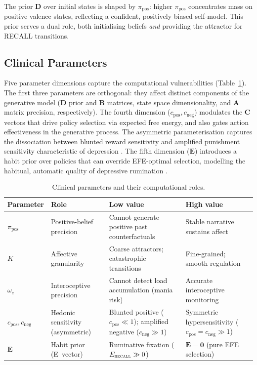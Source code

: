 \documentclass[11pt,a4paper]{article}
\begin{document}
The prior $\mathbf{D}$ over initial states is shaped by $\pi_{\text{pos}}$: higher $\pi_{\text{pos}}$ concentrates mass on positive valence states, reflecting a confident, positively biased self-model. This prior serves a dual role, both initialising beliefs \emph{and} providing the attractor for RECALL transitions.

\subsection{Clinical Parameters}

Five parameter dimensions capture the computational vulnerabilities (Table~\ref{tab:params}). The first three parameters are orthogonal: they affect distinct components of the generative model ($\mathbf{D}$ prior and $\mathbf{B}$ matrices, state space dimensionality, and $\mathbf{A}$ matrix precision, respectively). The fourth dimension ($c_{\text{pos}}, c_{\text{neg}}$) modulates the $\mathbf{C}$ vectors that drive policy selection via expected free energy, and also gates action effectiveness in the generative process. The asymmetric parameterisation captures the dissociation between blunted reward sensitivity and amplified punishment sensitivity characteristic of depression \citep{eshel2010reward, pizzagalli2014depression}. The fifth dimension ($\mathbf{E}$) introduces a habit prior over policies that can override EFE-optimal selection, modelling the habitual, automatic quality of depressive rumination \citep{nolenhoeksema1991responses, watkins2008constructive}.

\begin{table}[htbp]
\centering
\begin{tabular}{llll}
\toprule
\textbf{Parameter} & \textbf{Role} & \textbf{Low value} & \textbf{High value} \\
\midrule
$\pi_{\text{pos}}$ & Positive-belief precision & Cannot generate positive past counterfactuals & Stable narrative sustains affect \\
$K$ & Affective granularity & Coarse attractors; catastrophic transitions & Fine-grained; smooth regulation \\
$\omega_e$ & Interoceptive precision & Cannot detect load accumulation (mania risk) & Accurate interoceptive monitoring \\
$c_{\text{pos}}, c_{\text{neg}}$ & Hedonic sensitivity (asymmetric) & Blunted positive ($c_{\text{pos}} \ll 1$); amplified negative ($c_{\text{neg}} \gg 1$) & Symmetric hypersensitivity ($c_{\text{pos}} = c_{\text{neg}} \gg 1$) \\
$\mathbf{E}$ & Habit prior (E~vector) & Ruminative fixation ($E_{\textsc{recall}} \gg 0$) & $\mathbf{E} = \mathbf{0}$ (pure EFE selection) \\
\bottomrule
\end{tabular}
\caption{Clinical parameters and their computational roles.}
\label{tab:params}
\end{table}
\end{document}
